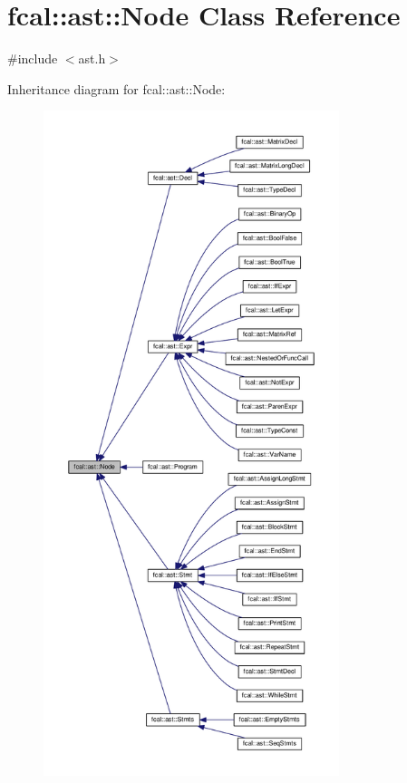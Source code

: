\hypertarget{classfcal_1_1ast_1_1Node}{}\section{fcal\+:\+:ast\+:\+:Node Class Reference}
\label{classfcal_1_1ast_1_1Node}


{\ttfamily \#include $<$ast.\+h$>$}



Inheritance diagram for fcal\+:\+:ast\+:\+:Node\+:
\nopagebreak
\begin{figure}[H]
\begin{center}
\leavevmode
\includegraphics[height=550pt]{classfcal_1_1ast_1_1Node__inherit__graph}
\end{center}
\end{figure}
